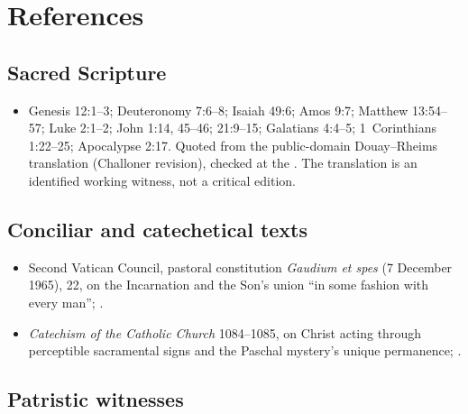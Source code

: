 \section{References}

\begingroup
\sloppy

\subsection*{Sacred Scripture}

{\fontsize{8.6}{9.6}\selectfont
\begin{itemize}[itemsep=0pt,parsep=0pt,topsep=0.05em]
\item Genesis 12:1--3; Deuteronomy 7:6--8; Isaiah 49:6; Amos 9:7; Matthew 13:54--57; Luke 2:1--2; John 1:14, 45--46; 21:9--15; Galatians 4:4--5; 1~Corinthians 1:22--25; Apocalypse 2:17. Quoted from the public-domain Douay--Rheims translation (Challoner revision), checked at the . The translation is an identified working witness, not a critical edition.
\end{itemize}}

\subsection*{Conciliar and catechetical texts}

{\fontsize{8.6}{9.6}\selectfont
\begin{itemize}[itemsep=0pt,parsep=0pt,topsep=0.05em]
\item Second Vatican Council, pastoral constitution \emph{Gaudium et spes} (7 December 1965), 22, on the Incarnation and the Son's union ``in some fashion with every man''; .
\item \emph{Catechism of the Catholic Church} 1084--1085, on Christ acting through perceptible sacramental signs and the Paschal mystery's unique permanence; .
\end{itemize}}

\subsection*{Patristic witnesses}

